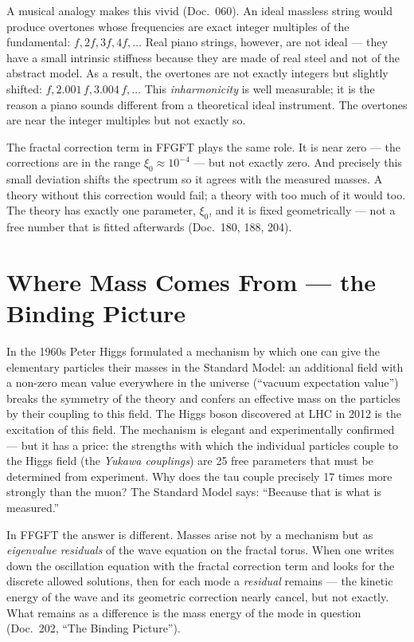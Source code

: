 A musical analogy makes this vivid (Doc.~060). An ideal massless
string would produce overtones whose frequencies are exact integer
multiples of the fundamental: $f, 2f, 3f, 4f, \ldots$ Real piano
strings, however, are not ideal --- they have a small intrinsic
stiffness because they are made of real steel and not of the
abstract model. As a result, the overtones are not exactly
integers but slightly shifted: $f, 2{.}001\,f, 3{.}004\,f, \ldots$
This \emph{inharmonicity} is well measurable; it is the reason a
piano sounds different from a theoretical ideal instrument. The
overtones are near the integer multiples but not exactly so.

The fractal correction term in FFGFT plays the same role. It is
near zero --- the corrections are in the range
$\xi_0 \approx 10^{-4}$ --- but not exactly zero. And precisely this
small deviation shifts the spectrum so it agrees with the measured
masses. A theory without this correction would fail; a theory with
too much of it would too. The theory has exactly one parameter,
$\xi_0$, and it is fixed geometrically --- not a free number that
is fitted afterwards (Doc.~180, 188, 204).

\section{Where Mass Comes From --- the Binding Picture}

In the 1960s Peter Higgs formulated a mechanism by which one can
give the elementary particles their masses in the Standard Model:
an additional field with a non-zero mean value everywhere in the
universe (\enquote{vacuum expectation value}) breaks the symmetry
of the theory and confers an effective mass on the particles by
their coupling to this field. The Higgs boson discovered at LHC in
2012 is the excitation of this field. The mechanism is elegant and
experimentally confirmed --- but it has a price: the strengths with
which the individual particles couple to the Higgs field (the
\emph{Yukawa couplings}) are 25 free parameters that must be
determined from experiment. Why does the tau couple precisely 17
times more strongly than the muon? The Standard Model says:
\enquote{Because that is what is measured.}

In FFGFT the answer is different. Masses arise not by a mechanism
but as \emph{eigenvalue residuals} of the wave equation on the
fractal torus. When one writes down the oscillation equation with
the fractal correction term and looks for the discrete allowed
solutions, then for each mode a \emph{residual} remains --- the
kinetic energy of the wave and its geometric correction nearly
cancel, but not exactly. What remains as a difference is the mass
energy of the mode in question (Doc.~202, \enquote{The Binding
Picture}).

